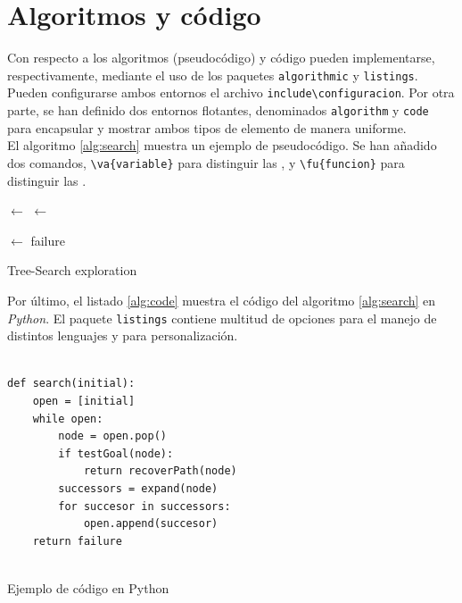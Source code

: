 \section{Algoritmos y código}

Con respecto a los algoritmos (pseudocódigo) y código pueden implementarse, respectivamente, mediante el uso de los paquetes \verb+algorithmic+ y \verb+listings+. Pueden configurarse ambos entornos el archivo \verb+include\configuracion+. Por otra parte, se han definido dos entornos flotantes, denominados \verb+algorithm+ y \verb+code+ para encapsular y mostrar ambos tipos de elemento de manera uniforme.\\


El algoritmo \ref{alg:search} muestra un ejemplo de pseudocódigo. Se han añadido dos comandos, \verb+\va{variable}+ para distinguir las , y \verb+\fu{funcion}+ para distinguir las . \\



\begin{algorithm}[b]
\begin{algorithmic}[1]
 	\State {} $\leftarrow$  
		\State {} $\leftarrow$ 
			\State \Return {} 
		\EndIf		
				
		\State {} $\leftarrow$ 
		 
			\State  {}
		\EndFor	
	\EndWhile
	\State \Return failure 
 	\EndFunction
\end{algorithmic}
\caption{Tree-Search exploration}
\label{alg:search}
\end{algorithm}

Por último, el listado \ref{alg:code} muestra el código del algoritmo \ref{alg:search} en \textit{Python}. El paquete \verb+listings+  contiene multitud de opciones para el manejo de distintos lenguajes y para personalización.

\begin{code}
\begin{lstlisting}

def search(initial):
	open = [initial]
	while open:
		node = open.pop()
		if testGoal(node):
			return recoverPath(node)
		successors = expand(node)
		for succesor in successors:
			open.append(succesor)
	return failure
		
\end{lstlisting}
\caption{Ejemplo de código en Python}
\label{alg:code}
\end{code}


